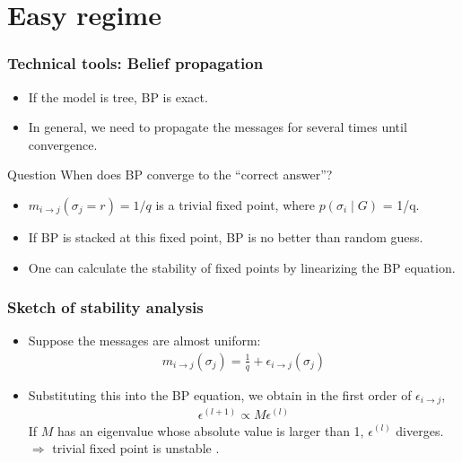 \documentclass[dvipdfmx,11pt]{beamer}
\begin{document}
\section{Easy regime}

\begin{frame}
  \frametitle{Technical tools: Belief propagation}
\begin{itemize}
  \item If the model is tree, BP is exact.
  \item In general, we need to propagate the messages for several times until convergence.
\end{itemize}


\begin{block}{Question}
  When does BP converge to the ``correct answer''?
\end{block}
\begin{itemize}
  \item $m_{i \to j}(\sigma_j=r) = 1/q$ is a trivial fixed point, where $p(\sigma_i \mid G)$ = 1/q.
  \item If BP is stacked at this fixed point, BP is no better than random guess.
  \item One can calculate the stability of fixed points by linearizing the BP equation. 
\end{itemize}

\end{frame}

\begin{frame}
  \frametitle{Sketch of stability analysis}
  \begin{itemize}
    \item Suppose the messages are almost uniform:
    \begin{align*}
      m_{i \to j}(\sigma_j) = \frac{1}{q} + \epsilon_{i \to j}(\sigma_j)
    \end{align*}
    \item Substituting this into the BP equation, we obtain in the first order of $\epsilon_{i \to j}$,
    \begin{align*}
      \epsilon^{(l+1)} \propto M \epsilon^{(l)}
    \end{align*}
    If $M$ has an eigenvalue whose absolute value is larger than 1, $\epsilon^{(l)}$ diverges. \\
    $\Rightarrow$ trivial fixed point is unstable \Smiley.
  \end{itemize}
\end{frame}
\end{document}
